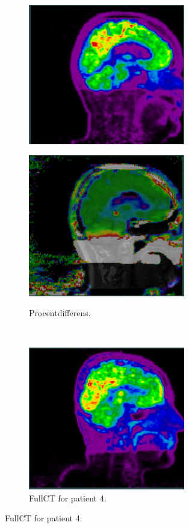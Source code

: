 \begin{figure}
\begin{subfigure}[b]{0.3\textwidth}
        \includegraphics[width=0.75\textwidth]{colager/loocv_pet/loocv_010850_pet_sct.png}
        \label{col:loocv_pet_pat3_sct}
    \end{subfigure}\hfill
    \begin{subfigure}[b]{0.3\textwidth}
        \caption{Procentdifferens.}
        \includegraphics[width=0.75\textwidth]{colager/loocv_pet/loocv_010850_pet_pd.png}
        \label{col:loocv_pet_pat3_pd}
    \end{subfigure}\\
    \begin{subfigure}[b]{0.3\textwidth}
        \caption{FullCT for patient 4.}
        \includegraphics[width=0.75\textwidth]{colager/loocv_pet/loocv_010960_pet_ct.png}

\end{subfigure}
\end{figure}
